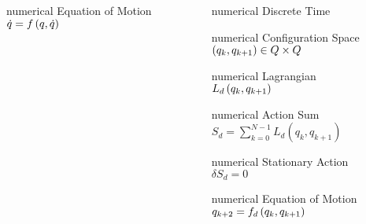 \begin{frame}
\begin{columns}[c]
\begin{column}{0.5\textwidth}
			\begin{beamercolorbox}[wd=0.8\columnwidth,sep=0.05cm,center]{numerical} 
				Equation of Motion \\
				\( \dot{q} = f \left( q, \dot{q}  \right) \)
			\end{beamercolorbox}
		\end{column}
		\pause
		\begin{column}{0.5\textwidth}
			\centering
			\begin{beamercolorbox}[wd=0.8\columnwidth,sep=0.05cm,center]{numerical} Discrete Time \end{beamercolorbox}
			\begin{beamercolorbox}[wd=0.8\columnwidth,sep=0.05cm,center]{numerical} 
				Configuration Space \\
				\( \left( q_k, q_{k+1}  \right) \in Q \times Q \)
			\end{beamercolorbox}
			\begin{beamercolorbox}[wd=0.8\columnwidth,sep=0.05cm,center]{numerical} 
				Lagrangian \\
				\( L_d\left( q_k, q_{k+1} \right) \)
			\end{beamercolorbox}
			\begin{beamercolorbox}[wd=0.8\columnwidth,sep=0.05cm,center]{numerical} 
				Action Sum \\
				\( S_d = \sum_{k=0}^{N-1} L_d(q_k, q_{k+1}) \)
			\end{beamercolorbox}
			\begin{beamercolorbox}[wd=0.8\columnwidth,sep=0.05cm,center]{numerical} 
				Stationary Action \\
				\( \delta S_d = 0 \)
			\end{beamercolorbox}
			\begin{beamercolorbox}[wd=0.8\columnwidth,sep=0.05cm,center]{numerical} 
				Equation of Motion \\
				\( q_{k+2} = f_d \left( q_k, q_{k+1}  \right) \)
			\end{beamercolorbox}
		\end{column}
	\end{columns}

\end{frame}%

